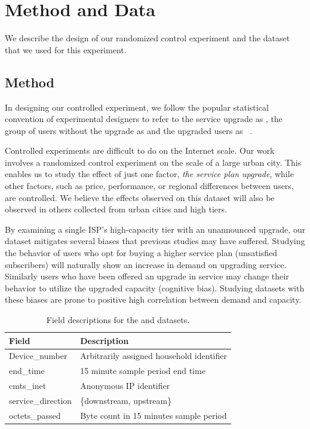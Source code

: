 \section{Method and Data}\label{sec:data}

We describe the design of our randomized control experiment and the
dataset that we used for this experiment.

\subsection{Method}

In designing our controlled experiment, we follow the popular
statistical convention of experimental designers to refer to the service
upgrade as \factor{}, the group of users without the upgrade as
\control{} and the upgraded users as \treatment{}~\cite{stats-design}.

Controlled experiments are difficult to do on the Internet scale.  Our
work involves a randomized control experiment on the scale of a large
urban city. This enables us to study the effect of just one factor,
\emph{the service plan upgrade}, while other factors, such as price,
performance, or regional differences between users, are controlled. We
believe the effects observed on this dataset will also be observed in
others collected from urban cities and high tiers.

By examining a single ISP's high-capacity tier with an unannounced upgrade,
our dataset mitigates several biases that previous studies may have 
suffered. Studying the behavior of users who opt for buying a higher service plan
(unsatisfied subscribers) will naturally show an increase in demand on
upgrading service\cite{dasu-imc2014}.
Similarly users who have been offered an
upgrade in service may change their behavior to utilize the upgraded capacity
(cognitive bias)\cite{zheleva2013}. Studying datasets with these biases are prone 
to positive high correlation between demand and capacity. 

\begin{table}[t]
\centering
\small
\begin{tabular}{| l | l |}
\hline
\textbf{Field}         & \textbf{Description}				\\\hline
Device\_number         & Arbitrarily assigned household identifier	\\
end\_time              & 15 minute sample period end time		\\
cmts\_inet             & Anonymous IP identifier			\\
service\_direction     & \{downstream, upstream\}                 	\\
octets\_passed         & Byte count in 15 minutes sample period		\\\hline
\end{tabular}
\caption{Field descriptions for the \control{} and \treatment{} datasets.}
\label{tab:field-description}
\end{table}

